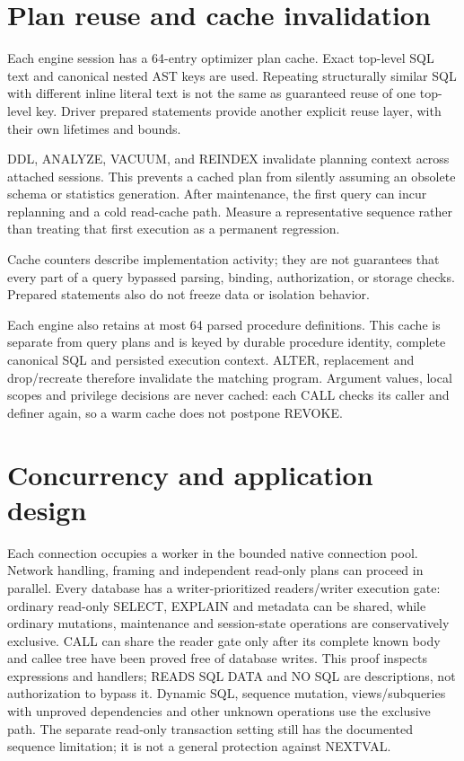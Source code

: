 \section{Plan reuse and cache invalidation}

Each engine session has a 64-entry optimizer plan cache. Exact top-level SQL text and canonical nested AST keys are used. Repeating structurally similar SQL with different inline literal text is not the same as guaranteed reuse of one top-level key. Driver prepared statements provide another explicit reuse layer, with their own lifetimes and bounds.

DDL, ANALYZE, VACUUM, and REINDEX invalidate planning context across attached sessions. This prevents a cached plan from silently assuming an obsolete schema or statistics generation. After maintenance, the first query can incur replanning and a cold read-cache path. Measure a representative sequence rather than treating that first execution as a permanent regression.

Cache counters describe implementation activity; they are not guarantees that every part of a query bypassed parsing, binding, authorization, or storage checks. Prepared statements also do not freeze data or isolation behavior.

Each engine also retains at most 64 parsed procedure definitions. This cache
is separate from query plans and is keyed by durable procedure identity,
complete canonical SQL and persisted execution context. ALTER, replacement
and drop/recreate therefore invalidate the matching program. Argument values,
local scopes and privilege decisions are never cached: each CALL checks its
caller and definer again, so a warm cache does not postpone REVOKE.

\section{Concurrency and application design}



Each connection occupies a worker in the bounded native connection pool.
Network handling, framing and independent read-only plans can proceed in
parallel. Every database has a writer-prioritized readers/writer execution
gate: ordinary read-only SELECT, EXPLAIN and metadata can be shared, while
ordinary mutations, maintenance and session-state operations are conservatively
exclusive. CALL can share the reader gate only after its complete known body
and callee tree have been proved free of database writes. This proof inspects
expressions and handlers; READS SQL DATA and NO SQL are descriptions, not
authorization to bypass it. Dynamic SQL, sequence mutation, views/subqueries
with unproved dependencies and other unknown operations use the exclusive
path. The separate read-only transaction setting still has the documented
sequence limitation; it is not a general protection against NEXTVAL.

